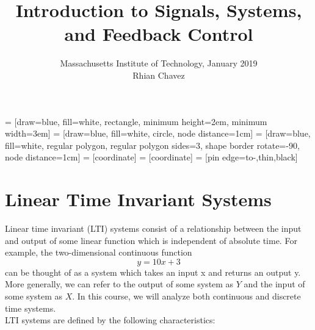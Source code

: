 \documentclass[a4paper]{article}
\title{Introduction to Signals, Systems, and Feedback Control}
\author{Massachusetts Institute of Technology, January 2019 \\ Rhian Chavez}
\date{}
\numberwithin{equation}{section}
\begin{document}
\maketitle

 = [draw=blue, fill=white, rectangle, 
    minimum height=2em, minimum width=3em]
 = [draw=blue, fill=white, circle, node distance=1cm]
 = [draw=blue, fill=white, regular polygon, regular polygon sides=3, shape border rotate=-90, node distance=1cm]
 = [coordinate]
 = [coordinate]
 = [pin edge={to-,thin,black}]

\tableofcontents
\newpage

\section{Linear Time Invariant Systems}

Linear time invariant (LTI) systems consist of a relationship between the input and output of some linear function which is independent of absolute time. For example, the two-dimensional continuous function 
\begin{equation}
y=10x+3
\end{equation}
can be thought of as a system which takes an input x and returns an output y. More generally, we can refer to the output of some system as $Y$ and the input of some system as $X$. In this course, we will analyze both continuous and discrete time systems. \\

LTI systems are defined by the following characteristics:
\begin{center}
\end{center}

\begin{center}
\end{center}
\end{document}
